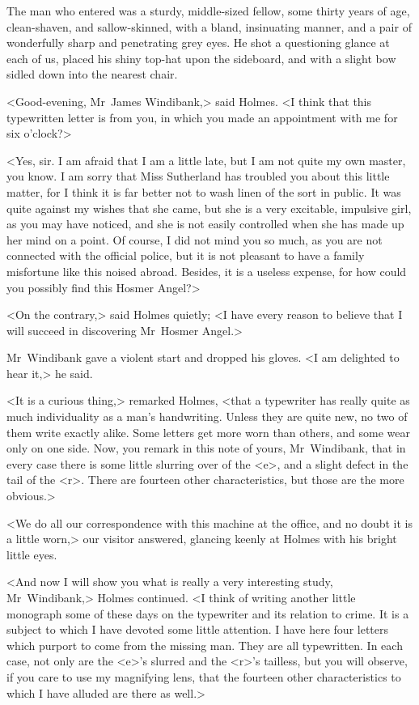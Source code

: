 The man who entered was a sturdy, middle-sized fellow, some thirty years of age, clean-shaven, and sallow-skinned, with a bland, insinuating manner, and a pair of wonderfully sharp and penetrating grey eyes. He shot a questioning glance at each of us, placed his shiny top-hat upon the sideboard, and with a slight bow sidled down into the nearest chair.

<Good-evening, Mr~James Windibank,> said Holmes. <I think that this typewritten letter is from you, in which you made an appointment with me for six o'clock?>

<Yes, sir. I am afraid that I am a little late, but I am not quite my own master, you know. I am sorry that Miss Sutherland has troubled you about this little matter, for I think it is far better not to wash linen of the sort in public. It was quite against my wishes that she came, but she is a very excitable, impulsive girl, as you may have noticed, and she is not easily controlled when she has made up her mind on a point. Of course, I did not mind you so much, as you are not connected with the official police, but it is not pleasant to have a family misfortune like this noised abroad. Besides, it is a useless expense, for how could you possibly find this Hosmer Angel?>

<On the contrary,> said Holmes quietly; <I have every reason to believe that I will succeed in discovering Mr~Hosmer Angel.>

Mr~Windibank gave a violent start and dropped his gloves. <I am delighted to hear it,> he said.

<It is a curious thing,> remarked Holmes, <that a typewriter has really quite as much individuality as a man's handwriting. Unless they are quite new, no two of them write exactly alike. Some letters get more worn than others, and some wear only on one side. Now, you remark in this note of yours, Mr~Windibank, that in every case there is some little slurring over of the <e>, and a slight defect in the tail of the <r>. There are fourteen other characteristics, but those are the more obvious.>

<We do all our correspondence with this machine at the office, and no doubt it is a little worn,> our visitor answered, glancing keenly at Holmes with his bright little eyes.

<And now I will show you what is really a very interesting study, Mr~Windibank,> Holmes continued. <I think of writing another little monograph some of these days on the typewriter and its relation to crime. It is a subject to which I have devoted some little attention. I have here four letters which purport to come from the missing man. They are all typewritten. In each case, not only are the <e>'s slurred and the <r>'s tailless, but you will observe, if you care to use my magnifying lens, that the fourteen other characteristics to which I have alluded are there as well.>

